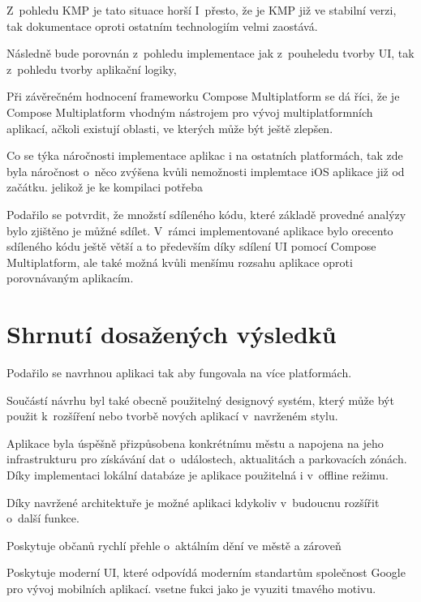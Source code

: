 Z~pohledu KMP je tato situace horší
I~přesto, že je KMP již ve stabilní verzi, tak dokumentace oproti ostatním technologiím velmi zaostává.



Následně bude porovnán z~pohledu implementace  jak z~pouheledu tvorby UI, tak z~pohledu tvorby aplikační logiky,



Při závěrečném hodnocení frameworku Compose Multiplatform se dá říci, že 
je Compose Multiplatform vhodným nástrojem pro vývoj multiplatformních aplikací, ačkoli existují oblasti, 
ve kterých může být ještě zlepšen.


Co se týka náročnosti implementace aplikac i na ostatních platformách, tak zde byla náročnost
o~něco zvýšena kvůli nemožnosti implemtace iOS aplikace již od začátku. jelikož je ke kompilaci potřeba 


Podařilo se potvrdit, že množstí sdíleného kódu, které základě provedné analýzy bylo zjištěno je můžné sdílet. V~rámci implementované aplikace
bylo orecento sdíleného kódu ještě větší a to především díky sdílení UI pomocí Compose Multiplatform, ale také možná kvůli menšímu rozsahu
aplikace oproti porovnávaným aplikacím. 




\section{Shrnutí dosažených výsledků}
Podařilo se navrhnou aplikaci tak aby fungovala na více platformách.

Součástí návrhu byl také obecně použitelný designový systém, který může být použit k~rozšíření nebo tvorbě nových aplikací v~navrženém stylu.

Aplikace byla úspěšně přizpůsobena konkrétnímu městu a napojena na jeho infrastrukturu pro získávání dat o~událostech, 
aktualitách a parkovacích zónách. Díky implementaci lokální databáze je aplikace použitelná i v~offline režimu.

Díky navržené architektuře je možné aplikaci kdykoliv v~budoucnu rozšířit o~další funkce. 

Poskytuje občanů rychlí přehle o~aktálním dění ve městě a zároveň 

Poskytuje moderní UI, které odpovídá moderním standartům společnost Google pro vývoj mobilních aplikací.
vsetne fukci jako je vyuziti tmavého motivu.

